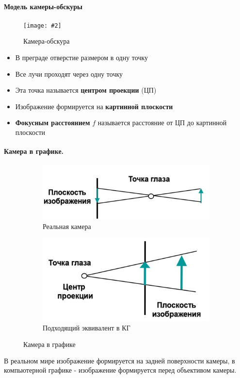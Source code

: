 \documentclass[a4paper, 14pt]{extarticle}
\newcommand{\screenshot}[3]{
	\begin{figure}[h]
		\centering
		\texttt{[image: \#2]}
		\caption{#3}
	\end{figure}
}
\begin{document}
\paragraph{Модель камеры-обскуры}
\screenshot{width=9cm}{l5/S021.jpg}{Камера-обскура}
\begin{itemize}
	\item В преграде отверстие размером в одну точку
	\item Все лучи проходят через одну точку
	\item Эта точка называется \textbf{центром проекции} (ЦП)
	\item Изображение формируется на \textbf{картинной плоскости}
	\item \textbf{Фокусным расстоянием} $f$ называется расстояние от ЦП до	картинной плоскости
\end{itemize}

\paragraph{Камера в графике. }
\begin{figure}[h]
	\centering
	\begin{subfigure}[b]{0.45\textwidth}
		\centering
		\includegraphics[width=\textwidth]{l5/S022.jpg}
		\caption{Реальная камера}
	\end{subfigure}
	\begin{subfigure}[b]{0.45\textwidth}
		\centering
		\includegraphics[width=\textwidth]{l5/S023.jpg}
		\caption{Подходящий эквивалент в КГ}
	\end{subfigure}
	\caption{Камера в графике}
\end{figure}
В реальном мире изображение формируется на задней поверхности камеры, в компьютерной графике - изображение формируется перед объективом камеры.
\end{document}
